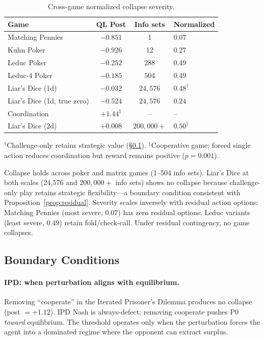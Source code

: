 \documentclass{article}
\begin{document}
\begin{table}[ht!]
\centering
\caption{Cross-game normalized collapse severity.}
\label{tab:cross-game}
\begin{tabular}{lccl}
\toprule
Game & QL Post & Info sets & Normalized \\
\midrule
Matching Pennies & $-0.851$ & 1    & $0.07$ \\
Kuhn Poker       & $-0.926$ & 12   & $0.27$ \\
Leduc Poker      & $-0.252$ & 288  & $0.49$ \\
Leduc-4 Poker    & $-0.185$ & $504$ & $0.49$ \\
Liar's Dice (1d) & $-0.032$ & $24{,}576$ & $0.48^\dagger$ \\
Liar's Dice (1d, true zero) & $\mathbf{-0.524}$ & $24{,}576$ & $0.24$ \\
Coordination     & $+1.44^{\ddagger}$ & -- & -- \\
Liar's Dice (2d) & $+0.008$ & $200{,}000{+}$ & $0.50^\dagger$ \\
\bottomrule
\end{tabular}

{\small $^\dagger$Challenge-only retains strategic value (\S\ref{sec:boundaries}). $^\ddagger$Cooperative game; forced single action reduces coordination but reward remains positive ($p\!=\!0.001$).}
\end{table}

Collapse holds across poker and matrix games (1--504 info sets). Liar's Dice at both scales (24{,}576 and $200{,}000{+}$ info sets) shows no collapse because challenge-only play retains strategic flexibility---a boundary condition consistent with Proposition~\ref{prop:residual}. Severity scales inversely with residual action options: Matching Pennies (most severe, 0.07) has zero residual options; Leduc variants (least severe, 0.49) retain fold/check-call. Under residual contingency, no game collapses.

\FloatBarrier
\subsection{Boundary Conditions}
\label{sec:boundaries}

\paragraph{IPD: when perturbation aligns with equilibrium.}
Removing ``cooperate'' in the Iterated Prisoner's Dilemma produces no collapse (post $= +1.12$). IPD Nash is always-defect; removing cooperate pushes P0 \emph{toward} equilibrium. The threshold operates only when the perturbation forces the agent into a dominated regime where the opponent can extract surplus.
\end{document}
